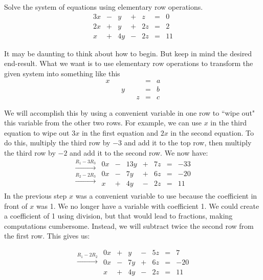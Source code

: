 \documentclass{ximera}
\begin{document}
\begin{example}\label{ex:threeeqthreevars1}
Solve the system of equations using elementary row operations.
$$\begin{array}{ccccccc}
      3x & -&y&+&z&= &0 \\
	 2x& +&y&+&2z&=&2\\
     x& +&4y&-&2z&=&11
    \end{array}$$
    
\begin{explanation}
It may be daunting to think about how to begin.  But keep in mind the desired end-result.  What we want is to use elementary row operations to transform the given system into something like this
$$\begin{array}{ccccccc}
      x & &&&&= &a \\
	 & &y&&&=&b\\
     & &&&z&=&c
    \end{array}$$
    
We will accomplish this by using a convenient variable in one row to ``wipe out" this variable from the other two rows.  For example, we can use $x$ in the third equation to wipe out $3x$ in the first equation and $2x$ in the second equation.  To do this, multiply the third row by $-3$ and add it to the top row, then multiply the third row by $-2$ and add it to the second row.  We now have:
$$\begin{array}{c}
 \xrightarrow{R_1-3R_3}\\
 \xrightarrow{R_2-2R_3}\\
\\
 \end{array}
 \begin{array}{ccccccc}
      0x & -&13y&+&7z&= &-33 \\
	 0x& -&7y&+&6z&=&-20\\
     x& +&4y&-&2z&=&11
    \end{array}$$
In the previous step $x$ was a convenient variable to use because the coefficient in front of $x$ was 1.  We no longer have a variable with coefficient 1.  We could create a coefficient of 1 using division, but that would lead to fractions, making computations cumbersome.  Instead, we will subtract twice the second row from the first row. This gives us:

$$\begin{array}{c}
 \xrightarrow{R_1-2R_2}\\
 \\
\\
 \end{array}
 \begin{array}{ccccccc}
      0x &+ &y&-&5z&= &7 \\
	 0x& -&7y&+&6z&=&-20\\
     x& +&4y&-&2z&=&11
    \end{array}$$


\end{explanation}
\end{example}
\end{document}
